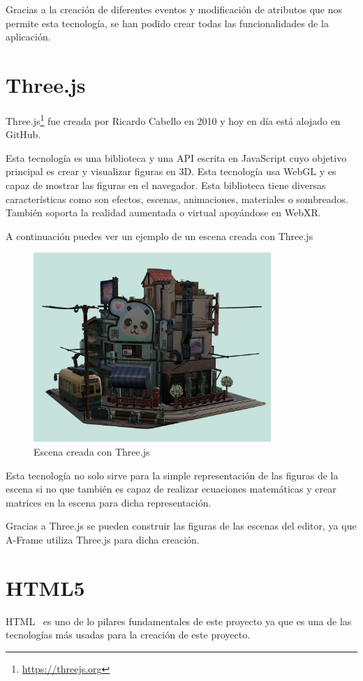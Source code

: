 \documentclass[a4paper, 12pt]{book}
\begin{document}
Gracias a la creación de diferentes eventos y  modificación de atributos  que nos permite esta tecnología, se han podido crear todas las funcionalidades de la aplicación.

\section{Three.js} %
\label{sec:Three}
Three.js\footnote{\url{https://threejs.org}} fue creada por Ricardo Cabello en 2010 y hoy en día está alojado en GitHub.

Esta tecnología es una biblioteca y una API escrita en JavaScript cuyo objetivo principal es crear y visualizar figuras en 3D. Esta tecnología usa WebGL y es capaz de mostrar las figuras en el navegador. Esta biblioteca tiene diversas características como son efectos, escenas, animaciones, materiales o sombreados. También soporta la realidad aumentada o virtual apoyándose en WebXR.

A continuación puedes ver un ejemplo de un escena creada con Three.js
\begin{figure}
  \centering
  \includegraphics[width=9cm, keepaspectratio]{img/threejs.png}
  \caption{Escena creada con Three.js}\label{fig:three}
\end{figure}

Esta tecnología no solo sirve para la simple representación de las figuras de la escena si no que también es capaz de realizar ecuaciones matemáticas y crear matrices en la escena para dicha representación.

Gracias a Three.js se pueden construir las figuras de las escenas del editor, ya que A-Frame utiliza Three.js para dicha creación.

\section{HTML5} %
\label{sec:HTML5}
HTML~\cite{HTML} es uno de lo pilares fundamentales de este proyecto ya que es una de las tecnologías más usadas para la creación de este proyecto.
\end{document}

